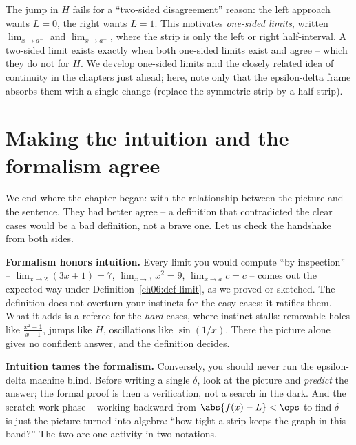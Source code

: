 \begin{connectionbox}
The jump in $H$ fails for a ``two-sided disagreement'' reason: the left approach
wants $L=0$, the right wants $L=1$. This motivates \emph{one-sided limits},
written $\lim_{x\to a^-}$ and $\lim_{x\to a^+}$, where the strip is only the left
or right half-interval. A two-sided limit exists exactly when both one-sided
limits exist and agree -- which they do not for $H$. We develop one-sided limits
and the closely related idea of continuity in the chapters just ahead; here, note
only that the epsilon-delta frame absorbs them with a single change (replace the
symmetric strip by a half-strip).
\end{connectionbox}

\section{Making the intuition and the formalism agree}
\label{ch06:agree}

We end where the chapter began: with the relationship between the picture and the
sentence. They had better agree -- a definition that contradicted the clear cases
would be a bad definition, not a brave one. Let us check the handshake from both
sides.

\textbf{Formalism honors intuition.} Every limit you would compute ``by
inspection'' -- $\lim_{x\to2}(3x+1)=7$, $\lim_{x\to3}x^2=9$, $\lim_{x\to a}c=c$ --
comes out the expected way under Definition~\ref{ch06:def-limit}, as we proved or
sketched. The definition does not overturn your instincts for the easy cases; it
ratifies them. What it adds is a referee for the \emph{hard} cases, where
instinct stalls: removable holes like $\frac{x^2-1}{x-1}$, jumps like $H$,
oscillations like $\sin(1/x)$. There the picture alone gives no confident answer,
and the definition decides.

\textbf{Intuition tames the formalism.} Conversely, you should never run the
epsilon-delta machine blind. Before writing a single $\delta$, look at the
picture and \emph{predict} the answer; the formal proof is then a verification,
not a search in the dark. And the scratch-work phase -- working backward from
$\abs{f(x)-L}<\eps$ to find $\delta$ -- is just the picture turned into algebra:
``how tight a strip keeps the graph in this band?'' The two are one activity in
two notations.

